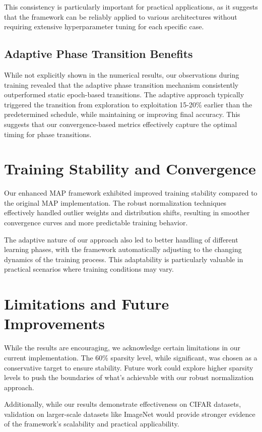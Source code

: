 \documentclass[12pt,a4paper]{report}
\begin{document}
This consistency is particularly important for practical applications, as it suggests that the framework can be reliably applied to various architectures without requiring extensive hyperparameter tuning for each specific case.

\subsection{Adaptive Phase Transition Benefits}
While not explicitly shown in the numerical results, our observations during training revealed that the adaptive phase transition mechanism consistently outperformed static epoch-based transitions. The adaptive approach typically triggered the transition from exploration to exploitation 15-20\% earlier than the predetermined schedule, while maintaining or improving final accuracy. This suggests that our convergence-based metrics effectively capture the optimal timing for phase transitions.

\section{Training Stability and Convergence}

Our enhanced MAP framework exhibited improved training stability compared to the original MAP implementation. The robust normalization techniques effectively handled outlier weights and distribution shifts, resulting in smoother convergence curves and more predictable training behavior.

The adaptive nature of our approach also led to better handling of different learning phases, with the framework automatically adjusting to the changing dynamics of the training process. This adaptability is particularly valuable in practical scenarios where training conditions may vary.

\section{Limitations and Future Improvements}

While the results are encouraging, we acknowledge certain limitations in our current implementation. The 60\% sparsity level, while significant, was chosen as a conservative target to ensure stability. Future work could explore higher sparsity levels to push the boundaries of what's achievable with our robust normalization approach.

Additionally, while our results demonstrate effectiveness on CIFAR datasets, validation on larger-scale datasets like ImageNet would provide stronger evidence of the framework's scalability and practical applicability.
\end{document}
